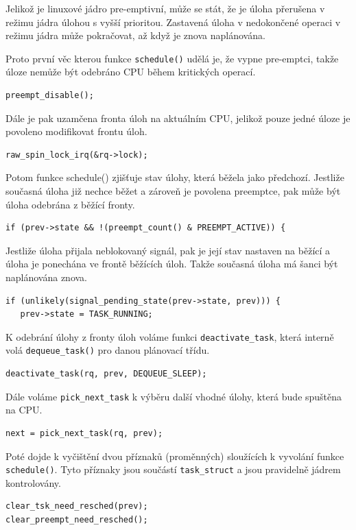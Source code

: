 \documentclass[
  master=true,
  font=sans,
  printversion=false,
  joinlists=true,
  figures=true,
  tables=true,
  sourcecodes=false,
  theorems=false,
  bibencoding=utf8,
  language=czech,
  encoding=utf8,
  field=ainfk,
  biblatex,
  glossaries,
  index
]{kidiplom}
\begin{document}
Jelikož je linuxové jádro pre-emptivní, může se stát, že je úloha přerušena v režimu jádra úlohou s vyšší prioritou. Zastavená úloha v nedokončené operaci v režimu jádra může pokračovat, až když je znova naplánována. 

Proto první věc kterou funkce \verb#schedule()# udělá je, že vypne pre-emptci, takže úloze nemůže být odebráno CPU během kritických operací. 
\begin{verbatim}
preempt_disable();
\end{verbatim}
Dále je pak uzamčena fronta úloh na aktuálním CPU, jelikož pouze jedné úloze je povoleno modifikovat frontu úloh.
\begin{verbatim}
raw_spin_lock_irq(&rq->lock);
\end{verbatim}
Potom funkce schedule() zjišťuje stav úlohy, která běžela jako předchozí. Jestliže současná úloha již nechce běžet a zároveň je povolena preemptce, pak může být úloha odebrána z běžící fronty. 
\begin{verbatim}
if (prev->state && !(preempt_count() & PREEMPT_ACTIVE)) {
\end{verbatim}
Jestliže úloha přijala neblokovaný signál, pak je její stav nastaven na běžící a úloha je ponechána ve frontě běžících úloh. Takže současná úloha má šanci být naplánována znova. 
\begin{verbatim}
if (unlikely(signal_pending_state(prev->state, prev))) {
   prev->state = TASK_RUNNING;
\end{verbatim}
K odebrání úlohy z fronty úloh voláme funkci \verb#deactivate_task#, která interně volá \verb#dequeue_task()# pro danou plánovací třídu.
\begin{verbatim}
deactivate_task(rq, prev, DEQUEUE_SLEEP);
\end{verbatim}
Dále voláme \verb#pick_next_task# k výběru další vhodné úlohy, která bude spuštěna na CPU. 
\begin{verbatim}
next = pick_next_task(rq, prev);
\end{verbatim}
Poté dojde k vyčištění dvou příznaků (proměnných) sloužících k vyvolání funkce \verb#schedule()#. Tyto příznaky jsou součástí \verb#task_struct# a jsou pravidelně jádrem kontrolovány. 
\begin{verbatim}
clear_tsk_need_resched(prev);
clear_preempt_need_resched();
\end{verbatim}
%
\end{document}
